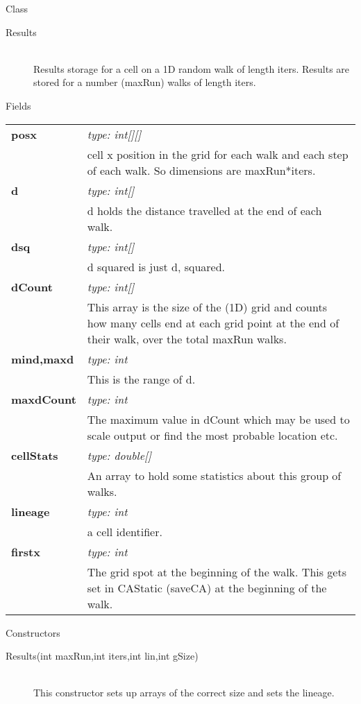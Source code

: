 \documentclass[11pt,a4paper]{article}
\newcommand \bt{\begin{longtable}{p{0.25\textwidth}p{0.74\textwidth}}}
\newcommand \et{\end{longtable}}
\newcommand{\hs}{\hspace{0.5cm}}
\newenvironment{di}
{\begin{flushright}
\begin{minipage}{0.95\textwidth}
\begin{description}
}
{\end{description}
\end{minipage}
\end{flushright}
}
\begin{document}
\noindent
\colorbox{classbg}{\parbox{1.0\textwidth}{\Large{Class}}}
\begin{di}
\item[\large{Results}]\qquad\\
Results storage for a cell on a 1D random walk of length iters. Results are stored for a number (maxRun) walks of length iters.
\end{di}
\colorbox{fieldbg}{\parbox{1.0\textwidth}{\Large{Fields}}}\vspace{0.5cm}
\bt
\hs \textbf{posx} & \emph{type: int[][]}\\
& \hs cell x position in the grid for each walk and each step of each walk. So dimensions are maxRun*iters.\\
\hs \textbf{d} & \emph{type: int[]}\\
& \hs d holds the distance travelled at the end of each walk.\\
\hs \textbf{dsq} & \emph{type: int[]}\\
& \hs d squared is just d, squared.\\
\hs \textbf{dCount} & \emph{type: int[]}\\
& \hs This array is the size of the (1D) grid and counts how many cells end at each grid point at the end of their walk, over the total maxRun walks.\\
\hs \textbf{mind,maxd} & \emph{type: int}\\
& \hs This is the range of d.\\
\hs \textbf{maxdCount} & \emph{type: int}\\
& \hs The maximum value in dCount which may be used to scale output or find the most probable location etc.\\
\hs \textbf{cellStats} & \emph{type: double[]}\\
& \hs An array to hold some statistics about this group of walks.\\
\hs \textbf{lineage} & \emph{type: int}\\
& \hs a cell identifier.\\
\hs \textbf{firstx} & \emph{type: int}\\
& \hs The grid spot at the beginning of the walk. This gets set in CAStatic (saveCA) at the beginning of the walk.\\
\et
\noindent\colorbox{conbg}{\parbox{1.0\textwidth}{\Large{Constructors}}}
\begin{di}
\item[{Results(int maxRun,int iters,int lin,int gSize)}]\qquad\\
This constructor sets up arrays of the correct size and sets the lineage.
\end{di}
\end{document}
